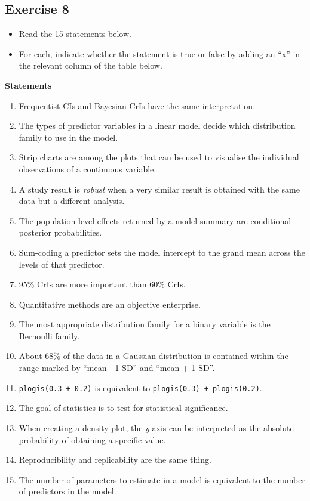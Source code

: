 \documentclass[
]{article}
\providecommand{\tightlist}{%
  \setlength{\itemsep}{0pt}\setlength{\parskip}{0pt}}
\begin{document}
\hypertarget{exercise-8}{%
\subsection{Exercise 8}\label{exercise-8}}

\begin{itemize}
\tightlist
\item
  Read the 15 statements below.
\item
  For each, indicate whether the statement is true or false by adding an
  ``x'' in the relevant column of the table below.
\end{itemize}

\textbf{Statements}

\begin{enumerate}
\def\labelenumi{\arabic{enumi}.}
\tightlist
\item
  Frequentist CIs and Bayesian CrIs have the same interpretation.
\item
  The types of predictor variables in a linear model decide which
  distribution family to use in the model.
\item
  Strip charts are among the plots that can be used to visualise the
  individual observations of a continuous variable.
\item
  A study result is \emph{robust} when a very similar result is obtained
  with the same data but a different analysis.
\item
  The population-level effects returned by a model summary are
  conditional posterior probabilities.
\item
  Sum-coding a predictor sets the model intercept to the grand mean
  across the levels of that predictor.
\item
  95\% CrIs are more important than 60\% CrIs.
\item
  Quantitative methods are an objective enterprise.
\item
  The most appropriate distribution family for a binary variable is the
  Bernoulli family.
\item
  About 68\% of the data in a Gaussian distribution is contained within
  the range marked by ``mean - 1 SD'' and ``mean + 1 SD''.
\item
  \texttt{plogis(0.3\ +\ 0.2)} is equivalent to
  \texttt{plogis(0.3)\ +\ plogis(0.2)}.
\item
  The goal of statistics is to test for statistical significance.
\item
  When creating a density plot, the \emph{y}-axis can be interpreted as
  the absolute probability of obtaining a specific value.
\item
  Reproducibility and replicability are the same thing.
\item
  The number of parameters to estimate in a model is equivalent to the
  number of predictors in the model.
\end{enumerate}
\end{document}
